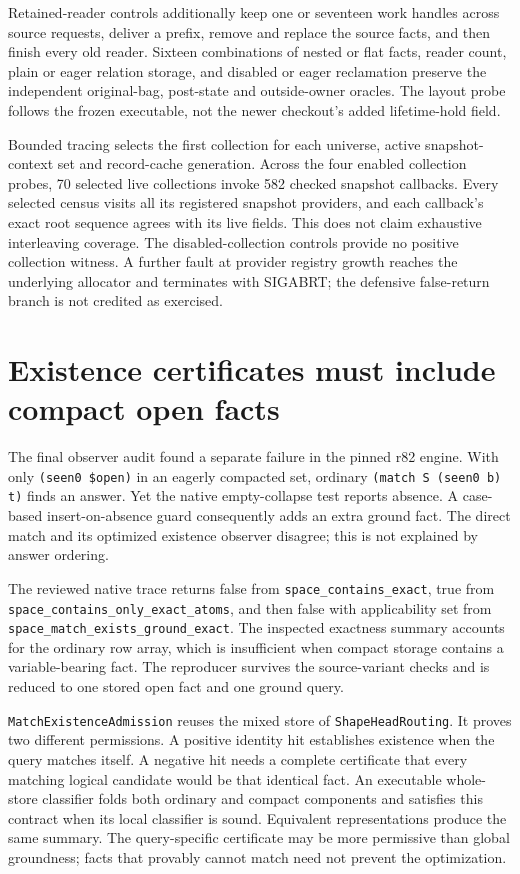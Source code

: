 \documentclass[11pt,a4paper]{article}
\newcommand{\code}[1]{\nolinkurl{#1}}
\begin{document}
Retained-reader controls additionally keep one or seventeen work handles
across source requests, deliver a prefix, remove and replace the source
facts, and then finish every old reader. Sixteen combinations of nested or
flat facts, reader count, plain or eager relation storage, and disabled or
eager reclamation preserve the independent original-bag, post-state and
outside-owner oracles. The layout probe follows the frozen executable, not
the newer checkout's added lifetime-hold field.

Bounded tracing selects the first collection for each universe, active
snapshot-context set and record-cache generation. Across the four enabled
collection probes, 70 selected live collections invoke 582 checked snapshot
callbacks. Every selected census visits all its registered snapshot providers,
and each callback's exact root sequence agrees with its live fields. This
does not claim exhaustive interleaving coverage. The disabled-collection
controls provide no positive collection witness. A further fault at provider
registry growth reaches the underlying allocator and terminates with SIGABRT;
the defensive false-return branch is not credited as exercised.

\section{Existence certificates must include compact open facts}

The final observer audit found a separate failure in the pinned r82 engine.
With only \verb|(seen0 $open)| in an eagerly compacted set, ordinary
\verb|(match S (seen0 b) t)| finds an answer. Yet the native empty-collapse
test reports absence. A case-based insert-on-absence guard consequently adds
an extra ground fact. The direct match and its optimized existence observer
disagree; this is not explained by answer ordering.

The reviewed native trace returns false from
\code{space_contains_exact}, true from
\code{space_contains_only_exact_atoms}, and then false with applicability
set from \code{space_match_exists_ground_exact}. The inspected exactness
summary accounts for the ordinary row array, which is insufficient when
compact storage contains a variable-bearing fact. The reproducer survives
the source-variant checks and is reduced to one stored open fact and one
ground query.

\code{MatchExistenceAdmission} reuses the mixed store of
\code{ShapeHeadRouting}. It proves two different permissions. A positive
identity hit establishes existence when the query matches itself. A negative
hit needs a complete certificate that every matching logical candidate would
be that identical fact. An executable whole-store classifier folds both
ordinary and compact components and satisfies this contract when its local
classifier is sound. Equivalent representations produce the same summary.
The query-specific certificate may be more permissive than global groundness;
facts that provably cannot match need not prevent the optimization.
\end{document}
